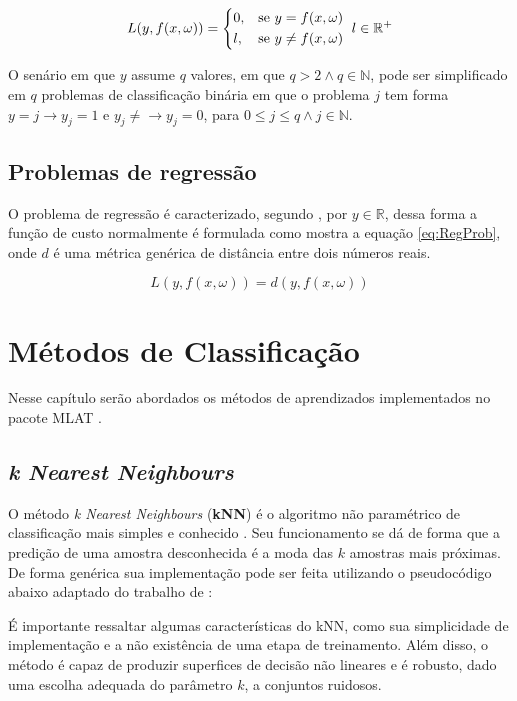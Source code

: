\begin{equation}
{	
	 L(y, f(x, \omega)) = \begin{dcases*}
	0,  & se $y = f(x, \omega)$ \\
	l,  & se $y \ne f(x, \omega)$ 
	\end{dcases*} \\ 
	l \in \mathbb {R^+}
}
\label{eq:ClassProb}
\end{equation}

O senário em que $y$ assume $q$ valores, em que $q > 2 \land q \in \mathbb {N}$, pode ser simplificado em $q$ problemas de classificação binária em que o problema $j$ tem forma $y = j \rightarrow y_j = 1$ e $y_j \neq  \rightarrow y_j = 0 $, para $ 0 \leq j \leq q \land j \in \mathbb {N}$.

\subsection{Problemas de regressão}
O problema de regressão é caracterizado, segundo , por $y \in \mathbb {R}$, dessa forma a função de custo normalmente é formulada como mostra a equação \ref{eq:RegProb}, onde $d$ é uma métrica genérica de distância entre dois números reais.

\begin{equation}
L(y, f(x, \omega)) = d(y, f(x, \omega))
\label{eq:RegProb}
\end{equation}

\section{Métodos de Classificação} 
Nesse capítulo serão abordados os métodos de aprendizados implementados no pacote MLAT \cite{PauloCirinoMLAT}. 

\subsection{\textit{k Nearest Neighbours}}
O método \textit{k Nearest Neighbours} (\textbf{kNN}) é o algoritmo não paramétrico de classificação mais simples e conhecido \cite{James20131} . Seu funcionamento se dá de forma que a predição de uma amostra desconhecida é a moda das $k$ amostras mais próximas. De forma genérica sua implementação pode ser feita utilizando o pseudocódigo abaixo adaptado do trabalho de  :

 

É importante ressaltar algumas características do kNN, como sua simplicidade de implementação e a não existência de uma etapa de treinamento. Além disso, o método é capaz de produzir superfices de decisão não lineares e é robusto, dado uma escolha adequada do parâmetro $k$, a conjuntos ruidosos.

